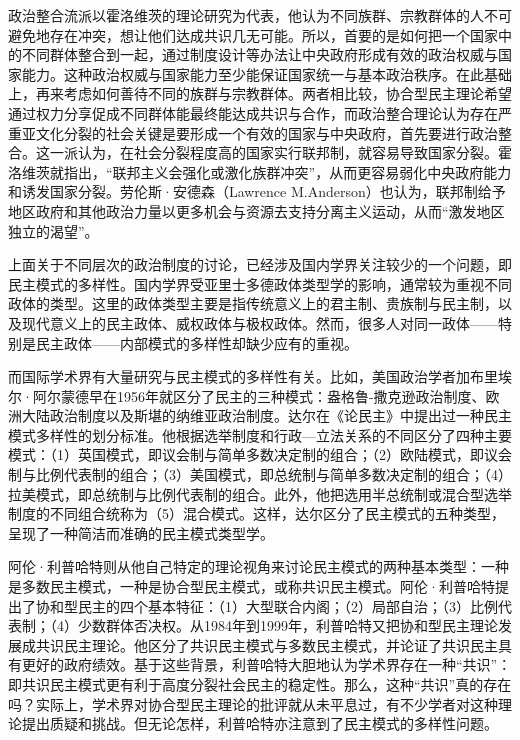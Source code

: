 政治整合流派以霍洛维茨的理论研究为代表，他认为不同族群、宗教群体的人不可避免地存在冲突，想让他们达成共识几无可能。所以，首要的是如何把一个国家中的不同群体整合到一起，通过制度设计等办法让中央政府形成有效的政治权威与国家能力。这种政治权威与国家能力至少能保证国家统一与基本政治秩序。在此基础上，再来考虑如何善待不同的族群与宗教群体。两者相比较，协合型民主理论希望通过权力分享促成不同群体能最终能达成共识与合作，而政治整合理论认为存在严重亚文化分裂的社会关键是要形成一个有效的国家与中央政府，首先要进行政治整合。这一派认为，在社会分裂程度高的国家实行联邦制，就容易导致国家分裂。霍洛维茨就指出，“联邦主义会强化或激化族群冲突”，从而更容易弱化中央政府能力和诱发国家分裂。劳伦斯·安德森（Lawrence M.Anderson）也认为，联邦制给予地区政府和其他政治力量以更多机会与资源去支持分离主义运动，从而“激发地区独立的渴望”。


上面关于不同层次的政治制度的讨论，已经涉及国内学界关注较少的一个问题，即民主模式的多样性。国内学界受亚里士多德政体类型学的影响，通常较为重视不同政体的类型。这里的政体类型主要是指传统意义上的君主制、贵族制与民主制，以及现代意义上的民主政体、威权政体与极权政体。然而，很多人对同一政体——特别是民主政体——内部模式的多样性却缺少应有的重视。

而国际学术界有大量研究与民主模式的多样性有关。比如，美国政治学者加布里埃尔·阿尔蒙德早在1956年就区分了民主的三种模式：盎格鲁-撒克逊政治制度、欧洲大陆政治制度以及斯堪的纳维亚政治制度。达尔在《论民主》中提出过一种民主模式多样性的划分标准。他根据选举制度和行政—立法关系的不同区分了四种主要模式：（1）英国模式，即议会制与简单多数决定制的组合；（2）欧陆模式，即议会制与比例代表制的组合；（3）美国模式，即总统制与简单多数决定制的组合；（4）拉美模式，即总统制与比例代表制的组合。此外，他把选用半总统制或混合型选举制度的不同组合统称为（5）混合模式。这样，达尔区分了民主模式的五种类型，呈现了一种简洁而准确的民主模式类型学。

阿伦·利普哈特则从他自己特定的理论视角来讨论民主模式的两种基本类型：一种是多数民主模式，一种是协合型民主模式，或称共识民主模式。阿伦·利普哈特提出了协和型民主的四个基本特征：（1）大型联合内阁；（2）局部自治；（3）比例代表制；（4）少数群体否决权。从1984年到1999年，利普哈特又把协和型民主理论发展成共识民主理论。他区分了共识民主模式与多数民主模式，并论证了共识民主具有更好的政府绩效。基于这些背景，利普哈特大胆地认为学术界存在一种“共识”：即共识民主模式更有利于高度分裂社会民主的稳定性。那么，这种“共识”真的存在吗？实际上，学术界对协合型民主理论的批评就从未平息过，有不少学者对这种理论提出质疑和挑战。但无论怎样，利普哈特亦注意到了民主模式的多样性问题。

